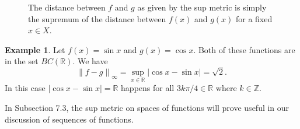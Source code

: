 \documentclass{article}
\newcommand{\R}{\mathbb{R}}
\newcommand{\Z}{\mathbb{Z}}
\newcommand{\norm}[1]{\left\lVert#1\right\rVert}
\theoremstyle{definition}
\newtheorem{example}{Example}[section]
\begin{document}
\begin{figure}[h!]
	\centering
	\caption{The distance between $ f $ and $ g $ as given by the sup metric is simply the supremum of the distance between $ f(x) $ and $ g(x) $ for a fixed $ x\in X $.}
\end{figure}
\begin{example}
	Let $ f(x)=\sin x $ and $ g(x)=\cos x $. Both of these functions are in the set $ BC(\R) $. We have $$\norm{f-g}_\infty=\sup_{x\in\R}|\cos x-\sin x|=\sqrt{2} .$$ In this case $ |\cos x-\sin x|=\R $ happens for all $ 3k\pi/4\in\R $ where $ k\in\Z $. 
\end{example}

In Subsection 7.3, the sup metric on spaces of functions will prove useful in our discussion of sequences of functions. 
\end{document}
